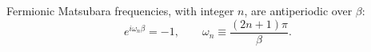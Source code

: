 \documentclass{article}
\begin{document}
Fermionic Matsubara frequencies, with integer $n$, are antiperiodic over $\beta$:
\begin{equation}
e^{i\omega_n\beta} = -1, \qquad \omega_n \equiv \frac{(2 n+1)\pi}{\beta} .
\label{eq:anti}
\end{equation}
\end{document}
